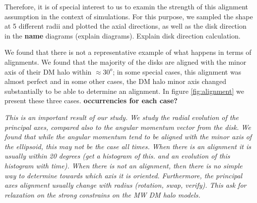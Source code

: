 \documentclass[a4paper,fleqn,usenatbib]{mnras}
\begin{document}
Therefore, it is of special interest to us to examin the strength of
this alignment assumption in the context of simulations. For this
purpose, we sampled the shape at 5 different radii and plotted the
axial directions, as well as the disk direction in the \textbf{name}
diagrams \cite{} (explain diagrams). Explain disk direction
calculation. 

We found that there is not a representative example of what happens in
terms of alignments. We found that the majority of the disks are
aligned with the minor axis of their DM halo within $\approx 30^o$; in
some special cases, this alignment was almost perfect and in some
other cases, the DM halo minor axis changed substantially to be able
to determine an alignment. In figure \ref{fig:alignment} we present
these three cases. \textbf{occurrencies for each case?} 


\textit{This is an important result of our study. We study the radial
  evolution of the principal axes, compared also to the angular
  momentum vector from the disk. We found that while the angular
  momentum tend to be aligned with the minor axis of the ellipsoid,
  this may not be the case all times. When there is an alignment it is
  usually within 20 degrees (get a histogram of this. and an evolution
  of this histogram with time). When there is not an alignment, then
  there is no simple way to determine towards which axis it is
  oriented. Furthermore, the principal axes alignment usually change
  with radius (rotation, swap, verify). This ask for relaxation on the
  strong constrains on the MW DM halo models.} 
\end{document}
